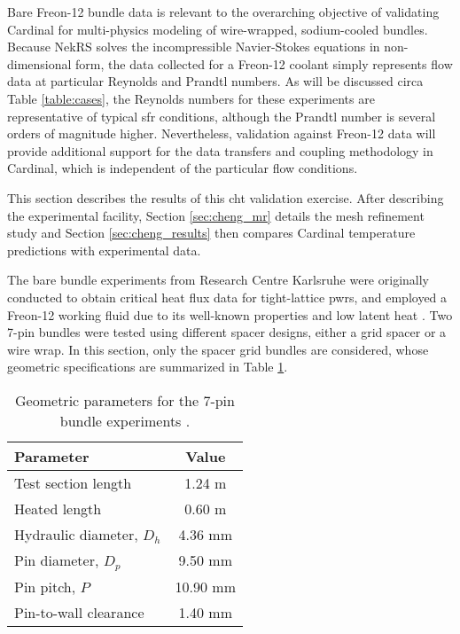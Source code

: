 \documentclass[3p,,preprint,11pt]{elsarticle}
\begin{document}
Bare Freon-12 bundle data is relevant to the overarching objective of validating Cardinal for multi-physics modeling of wire-wrapped, sodium-cooled bundles. Because NekRS solves the incompressible Navier-Stokes equations in non-dimensional form, the data collected for a Freon-12 coolant simply represents flow data at particular Reynolds and Prandtl numbers. As will be discussed circa Table \ref{table:cases}, the Reynolds numbers for these experiments are representative of typical \gls{sfr} conditions, although the Prandtl number is several orders of magnitude higher. Nevertheless, validation against Freon-12 data will provide additional support for the data transfers and coupling methodology in Cardinal, which is independent of the particular flow conditions.

This section describes the results of this \gls{cht} validation exercise. After describing the experimental facility, Section \ref{sec:cheng_mr} details the mesh refinement study and Section \ref{sec:cheng_results} then compares Cardinal temperature predictions with experimental data.

The bare bundle experiments from Research Centre Karlsruhe were originally conducted to obtain critical heat flux data for tight-lattice \glspl{pwr}, and employed a Freon-12 working fluid due to its well-known properties and low latent heat \cite{freon}. Two 7-pin bundles were tested using different spacer designs, either a grid spacer or a wire wrap. In this section, only the spacer grid bundles are considered, whose geometric specifications are summarized in Table \ref{table:geom}. 

\begin{table}[htb!]
\caption{Geometric parameters for the 7-pin bundle experiments \cite{cheng2009}.}
\centering
\begin{tabular}{@{}lc@{}}
\toprule
Parameter & Value\\
\midrule
Test section length & \phantom{0}1.24 \si{\meter}\phantom{m}\\
Heated length & \phantom{0}0.60 \si{\meter}\phantom{m}\\
Hydraulic diameter, $D_h$ & \phantom{0}4.36 \si{\milli\meter}\\
Pin diameter, $D_p$ & \phantom{0}9.50 \si{\milli\meter}\\
Pin pitch, $P$ & 10.90 \si{\milli\meter}\\
Pin-to-wall clearance & \phantom{0}1.40 \si{\milli\meter}\\
\bottomrule
\end{tabular}
\label{table:geom}
\end{table}
\end{document}
